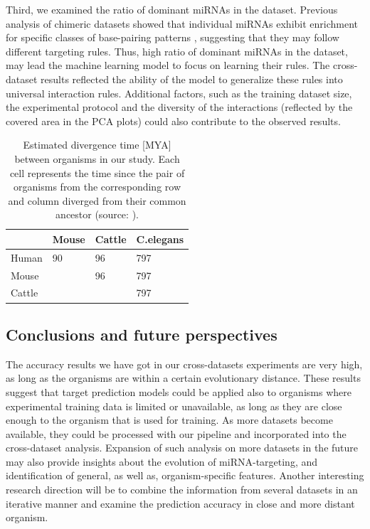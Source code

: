 \documentclass{bmcart}
\begin{document}
Third, we examined the ratio of dominant miRNAs in the dataset. Previous analysis of chimeric datasets showed that individual miRNAs exhibit enrichment for specific classes of base-pairing patterns \cite{helwak2013mapping, broughton2016pairing}, suggesting that they may follow different targeting rules. Thus, high ratio of dominant miRNAs in the dataset, may lead the machine learning model to focus on learning their rules. The cross-dataset results reflected the ability of the model to generalize these rules into universal interaction rules. Additional factors, such as the training dataset size, the experimental protocol and the diversity of the interactions (reflected by the covered area in the PCA plots) could also contribute to the observed results. \\


\begin{table}[h!]
\caption{Estimated divergence time {[}MYA{]} between organisms in our study. Each cell represents the time since the pair of organisms from the corresponding row and column diverged from their common ancestor (source: \cite{kumar2017timetree}).}
\label{tab:evolutiontime}
\begin{tabular}{|l|l|l|l|}
\hline
             & Mouse & Cattle & C.elegans \\ \hline
Human & 90  & 96         & 797                    \\ \hline
Mouse          &     & 96         & 797                    \\ \hline
Cattle   &     &            & 797                    \\ \hline
\end{tabular}
\end{table}

\subsection*{Conclusions and future perspectives}
The accuracy results we have got in our cross-datasets experiments are very high, as long as the organisms are within a certain evolutionary distance. These results suggest that target prediction models could be applied also to organisms where experimental training data is limited or unavailable, as long as they are close enough to the organism that is used for training.
As more datasets become available, they could be processed with our pipeline and incorporated into the cross-dataset analysis. Expansion of such analysis on more datasets in the future may also provide insights about the evolution of miRNA-targeting, and identification of general, as well as, organism-specific features. Another interesting research direction will be to combine the information from several datasets in an iterative manner and examine the prediction accuracy in close and more distant organism.
\end{document}
